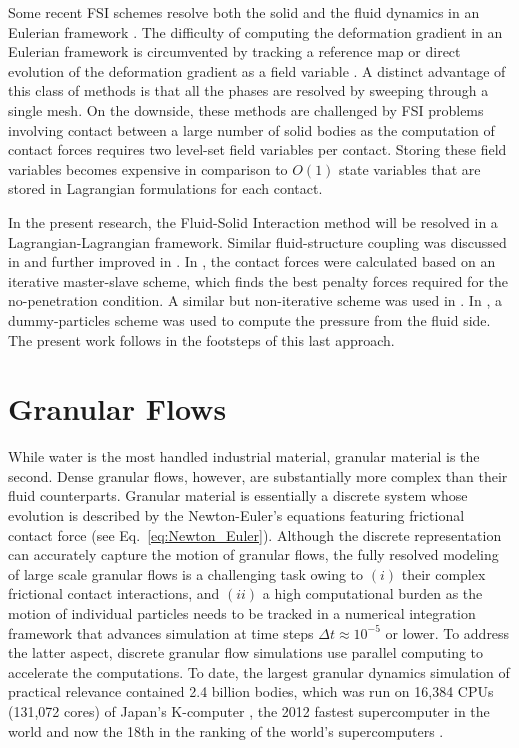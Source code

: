 Some recent FSI schemes resolve both the solid and the fluid dynamics in an Eulerian framework \cite{valkov2015eulerian,kamrin2012reference, liu2001eulerian,miller2002conservative}. The difficulty of computing the deformation gradient in an Eulerian framework is circumvented by tracking a reference map \cite{valkov2015eulerian,kamrin2012reference} or direct evolution of the deformation gradient as a field variable \cite{liu2001eulerian}. A distinct advantage of this class of methods is that all the phases are resolved by sweeping through a single mesh. On the downside, these methods are challenged by FSI problems involving contact between a large number of solid bodies as the computation of contact forces requires two level-set field variables per contact. Storing these field variables becomes expensive in comparison to $O(1)$ state variables that are stored in Lagrangian formulations \cite{valkov2015eulerian} for each contact.

In the present research, the Fluid-Solid Interaction method will be resolved in a Lagrangian-Lagrangian framework. Similar fluid-structure coupling was discussed in \cite{attaway1994} and further improved in \cite{fourey2010,Vuyst2005,groenenboom2010}. In \cite{attaway1994}, the contact forces were calculated based on an iterative master-slave scheme, which finds the best penalty forces required for the no-penetration condition. A similar but non-iterative scheme was used in \cite{groenenboom2010}. In \cite{fourey2010,armanCompFluids2015}, a dummy-particles scheme was used to compute the pressure from the fluid side. The present work follows in the footsteps of this last approach. 







\section{Granular Flows}\label{sec:back_granular}
While water is the most handled industrial material, granular material is the second.  Dense granular flows, however, are substantially more complex than their fluid counterparts. Granular material is essentially a discrete system whose evolution is described by the Newton-Euler's equations featuring frictional contact force (see Eq.~\ref{eq:Newton_Euler}). Although the discrete representation can accurately capture the motion of granular flows, the fully resolved modeling of large scale granular flows is a challenging task owing to $(i)$ their complex frictional contact interactions, and $(ii)$ a high computational burden as the motion of individual particles needs to be tracked in a numerical integration framework that advances simulation at time steps $\Delta t \approx 10^{-5}$ or lower. To address the latter aspect, discrete granular flow simulations use parallel computing to accelerate the computations. To date, the largest granular dynamics simulation of practical relevance contained 2.4 billion bodies, which was run on 16,384 CPUs (131,072 cores) of Japan's K-computer \cite{billBodyDEMJapanSC2017,japanDEMlarge2018}, the 2012 fastest supercomputer in the world and now the 18th in the ranking of the world's supercomputers \cite{TOP500}.

